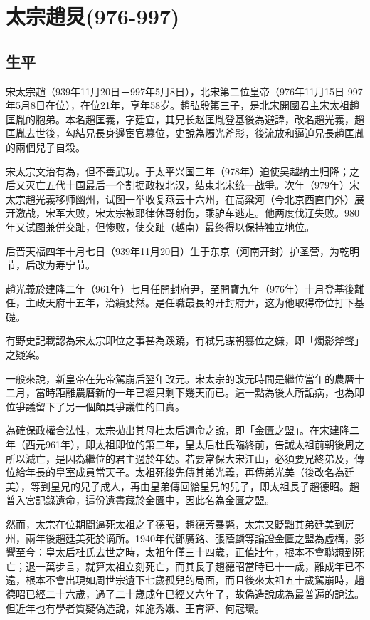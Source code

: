 
\section{太宗趙炅\tiny(976-997)}

\subsection{生平}

宋太宗趙（939年11月20日－997年5月8日），北宋第二位皇帝（976年11月15日-997年5月8日在位），在位21年，享年58岁。趙弘殷第三子，是北宋開國君主宋太祖趙匡胤的胞弟。本名趙匡義，字廷宜，其兄长赵匡胤登基後為避諱，改名趙光義，趙匡胤去世後，勾結兄長身邊宦官篡位，史說為燭光斧影，後流放和逼迫兄長趙匡胤的兩個兒子自殺。

宋太宗文治有為，但不善武功。于太平兴国三年（978年）迫使吴越纳土归降；之后又灭亡五代十国最后一个割据政权北汉，结束北宋统一战爭。次年（979年）宋太宗趙光義移师幽州，试图一举收复燕云十六州，在高粱河（今北京西直门外）展开激战，宋军大败，宋太宗被耶律休哥射伤，乘驴车逃走。他两度伐辽失败。980年又试图兼併交趾，但惨败，使交趾（越南）最终得以保持独立地位。

后晋天福四年十月七日（939年11月20日）生于东京（河南开封）护圣营，为乾明节，后改为寿宁节。

趙光義於建隆二年（961年）七月任開封府尹，至開寶九年（976年）十月登基後離任，主政天府十五年，治績斐然。是任職最長的开封府尹，这为他取得帝位打下基礎。

有野史記載認為宋太宗即位之事甚為蹊蹺，有弒兄謀朝篡位之嫌，即「燭影斧聲」之疑案。

一般來說，新皇帝在先帝駕崩后翌年改元。宋太宗的改元時間是繼位當年的農曆十二月，當時距離農曆新的一年已經只剩下幾天而已。這一點為後人所詬病，也為即位爭議留下了另一個頗具爭議性的口實。

為確保政權合法性，太宗拋出其母杜太后遺命之說，即「金匱之盟」。在宋建隆二年（西元961年），即太祖即位的第二年，皇太后杜氏臨終前，告誡太祖前朝後周之所以滅亡，是因為繼位的君主過於年幼。若要常保大宋江山，必須要兄終弟及，傳位給年長的皇室成員當天子。太祖死後先傳其弟光義，再傳弟光美（後改名為廷美），等到皇兄的兒子成人，再由皇弟傳回給皇兄的兒子，即太祖長子趙德昭。趙普入宮記錄遺命，這份遺書藏於金匱中，因此名為金匱之盟。

然而，太宗在位期間逼死太祖之子德昭，趙德芳暴斃，太宗又貶黜其弟廷美到房州，兩年後趙廷美死於谪所。1940年代鄧廣銘、張蔭麟等論證金匱之盟為虛構，影響至今：皇太后杜氏去世之時，太祖年僅三十四歲，正值壯年，根本不會聯想到死亡；退一萬步言，就算太祖立刻死亡，而其長子趙德昭當時已十一歲，離成年已不遠，根本不會出現如周世宗遺下七歲孤兒的局面，而且後來太祖五十歲駕崩時，趙德昭已經二十六歲，過了二十歲成年已經又六年了，故偽造說成為最普遍的說法。但近年也有學者質疑偽造說，如施秀娥、王育濟、何冠環。

